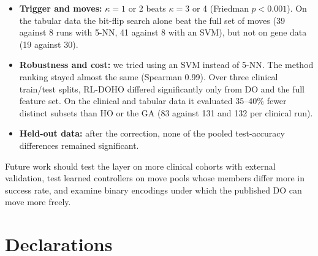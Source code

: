 \documentclass[pdflatex,sn-basic]{sn-jnl}
\begin{document}
\begin{itemize}
\item \textbf{Trigger and moves:} $\kappa=1$ or 2 beats $\kappa=3$ or 4 (Friedman $p<0.001$). On the tabular data the bit-flip search alone beat the full set of moves (39 against 8 runs with 5-NN, 41 against 8 with an SVM), but not on gene data (19 against 30).
\item \textbf{Robustness and cost:} we tried using an SVM instead of 5-NN. The method ranking stayed almost the same (Spearman 0.99). Over three clinical train/test splits, RL-DOHO differed significantly only from DO and the full feature set. On the clinical and tabular data it evaluated 35--40\% fewer distinct subsets than HO or the GA (83 against 131 and 132 per clinical run).
\item \textbf{Held-out data:} after the correction, none of the pooled test-accuracy differences remained significant.
\end{itemize}
Future work should test the layer on more clinical cohorts with external validation, test learned controllers on move pools whose members differ more in success rate, and examine binary encodings under which the published DO can move more freely.

\backmatter

\section*{Declarations}
\end{document}
